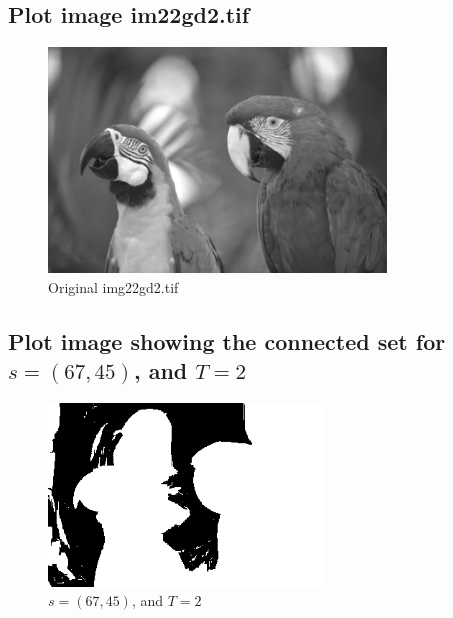 \documentclass{article}
\begin{document}
\subsection{Plot image im22gd2.tif}
	\begin{figure}[h]
		\begin{center}
			\includegraphics[width=0.8\textwidth]{img22gd2.png}
			\caption{Original img22gd2.tif}
		\end{center}
	\end{figure}

\pagebreak

\subsection{Plot image showing the connected set for $s=(67,45)$, and $T=2$}
	\begin{figure}[h]
		\begin{center}
			\includegraphics[width=0.65\textwidth]{img22gd2_af2.png}
			\caption{$s=(67,45)$, and $T=2$}
		\end{center}
	\end{figure}
\end{document}

